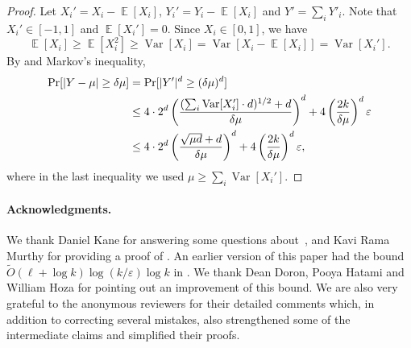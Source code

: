 \documentclass{toc}
\def\eps{\varepsilon}
\def\Blocklength{\ell}
\DeclarePairedDelimiter{\abs}{\lvert}{\rvert}
\DeclareMathOperator*{\E}{\mathbb{E}}                 %
\DeclareMathOperator*{\Var}{Var}                 %
\begin{document}
  \tailbound*

  \begin{proof}
    Let $X_i' = X_i - \E[X_i]$, $Y_i' = Y_i - \E[X_i]$ and $Y' = \sum_i Y'_i$.
    Note that $X_i' \in [-1,1]$ and $\E[X_i'] = 0$.
    Since $X_i \in [0,1]$, we have
    \[
      \E[X_i] \ge \E[X_i^2] \ge \Var[X_i] = \Var[X_i - \E[X_i]] = \Var[X_i'] .
    \]
    By  and Markov's inequality,
    \begin{align*}
      \Pr[ \abs{Y - \mu} \ge \delta \mu ]
      &= \Pr[ \abs{Y'}^d \ge (\delta \mu)^d ] \\
      &\le 4 \cdot 2^d \left( \frac{( \sum_i \Var[X_i'] \cdot d )^{1/2} + d}{ \delta \mu} \right)^d + 4 \left( \frac{2k}{\delta \mu} \right)^d \eps \\
      &\le 4 \cdot 2^d \left( \frac{\sqrt{\mu d} + d}{ \delta \mu} \right)^d + 4 \left( \frac{2k}{\delta \mu} \right)^d \eps,
    \end{align*}
		where in the last inequality we used $\mu \ge \sum_i \Var[X_i']$.
	\end{proof}



\paragraph{Acknowledgments.}  We thank Daniel Kane for answering some questions about~\cite{GopalanKM18}, and Kavi Rama Murthy for providing a proof of .
An earlier version of this paper had the bound $\tilde O(\Blocklength + \log k) \log(k/\eps) \log k$ in .
We thank Dean Doron, Pooya Hatami and William Hoza for pointing out an improvement of this bound.
We are also very grateful to the anonymous reviewers for their detailed comments which, in addition to correcting several mistakes, also strengthened some of the intermediate claims and simplified their proofs.  


%
%
%
%

\end{document}
